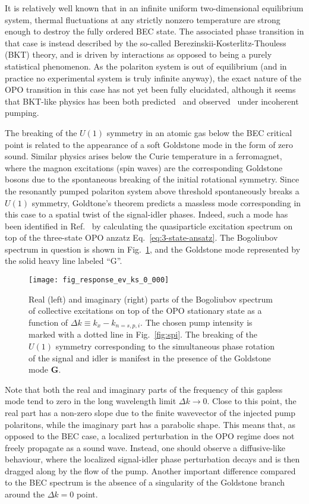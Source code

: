 It is relatively well known that in an infinite uniform
two-dimensional equilibrium system, thermal fluctuations at any
strictly nonzero temperature are strong enough to destroy the fully
ordered BEC state. The associated phase transition in that case is
instead described by the so-called Berezinskii-Kosterlitz-Thouless
(BKT) theory, and is driven by interactions as opposed to being a
purely statistical phenomenon. As the polariton system is out of
equilibrium (and in practice no experimental system is truly infinite
anyway), the exact nature of the OPO transition in this case has not
yet been fully elucidated, although it seems that BKT-like physics has
been both predicted~\cite{Szyma_ska_2006} and
observed~\cite{Roumpos2012} under incoherent pumping.

The breaking of the $U(1)$ symmetry in an atomic gas below the BEC
critical point is related to the appearance of a soft Goldstone mode
in the form of zero sound. Similar physics arises below the Curie
temperature in a ferromagnet, where the magnon excitations (spin
waves) are the corresponding Goldstone bosons due to the spontaneous
breaking of the initial rotational symmetry. Since the resonantly
pumped polariton system above threshold spontaneously breaks a $U(1)$
symmetry, Goldtone's theorem predicts a massless mode corresponding in
this case to a spatial twist of the signal-idler phases. Indeed, such
a mode has been identified in Ref.~\cite{Wouters_2007} by calculating
the quasiparticle excitation spectrum on top of the three-state OPO
anzatz Eq.~\eqref{eq:3-state-ansatz}. The Bogoliubov spectrum in
question is shown in Fig.~\ref{fig:goldstone}, and the Goldstone mode
represented by the solid heavy line labeled ``G''.
%
\begin{figure}[tb]\centering
  \texttt{[image: fig\_response\_ev\_ks\_0\_000]}
  \caption{
    Real (left) and imaginary (right) parts of the Bogoliubov spectrum
    of collective excitations on top of the OPO stationary state as a
    function of $\Delta k \equiv k_x - k_{n=s,p,i}$. The chosen pump intensity is
    marked with a dotted line in Fig.~\ref{fig:spi}. The breaking of the
    $U(1)$ symmetry corresponding to the simultaneous phase rotation of
    the signal and idler is manifest in the presence of the Goldstone mode
    \textbf{G}.
  }\label{fig:goldstone}
\end{figure}
% 
Note that both the real and imaginary parts of the frequency of this
gapless mode tend to zero in the long wavelength limit
$\Delta k \rightarrow 0$. Close to this point, the real part has a
non-zero slope due to the finite wavevector of the injected pump
polaritons, while the imaginary part has a parabolic shape. This means
that, as opposed to the BEC case, a localized perturbation in the OPO
regime does not freely propagate as a sound wave. Instead, one should
observe a diffusive-like behaviour, where the localized signal-idler
phase perturbation decays and is then dragged along by the flow of the
pump. Another important difference compared to the BEC spectrum is the
absence of a singularity of the Goldstone branch around the
$\Delta k = 0$ point.


